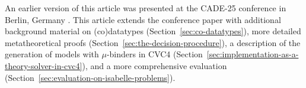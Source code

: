 \documentclass[smallcondensed,draft]{svjour3}
\newcommand\keyw[1]{\textbf{#1}}
\newcommand\const[1]{\textsf{#1}}
\newcommand\ty[1]{\textit{#1}}
\begin{document}
An earlier version of this article was presented at the CADE-25 conference in
Berlin, Germany \cite{reynolds-blanchette-2015-codata}.
This article extends the conference paper with additional
background material on (co)datatypes (Section~\ref{sec:co-datatypes}), more
detailed metatheoretical proofs (Section~\ref{sec:the-decision-procedure}),
a description of the generation of models with $\mu$-binders in CVC4
(Section~\ref{sec:implementation-as-a-theory-solver-in-cvc4}), and a more
comprehensive evaluation (Section~\ref{sec:evaluation-on-isabelle-problems}).



%










\end{document}
